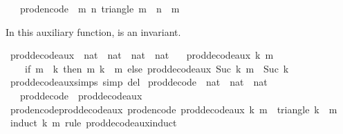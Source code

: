 \begin{isabellebody}
\ \ \ {\isachardoublequoteopen}prod{\isacharunderscore}encode\ {\isacharequal}\ {\isacharparenleft}{\isasymlambda}{\isacharparenleft}m{\isacharcomma}\ n{\isacharparenright}{\isachardot}\ triangle\ {\isacharparenleft}m\ {\isacharplus}\ n{\isacharparenright}\ {\isacharplus}\ m{\isacharparenright}{\isachardoublequoteclose}%
\begin{isamarkuptext}%
In this auxiliary function,  is an invariant.%
\end{isamarkuptext}\isamarkuptrue%
\isamarkupfalse%
\ prod{\isacharunderscore}decode{\isacharunderscore}aux\ {\isacharcolon}{\isacharcolon}\ {\isachardoublequoteopen}nat\ {\isasymRightarrow}\ nat\ {\isasymRightarrow}\ nat\ {\isasymtimes}\ nat{\isachardoublequoteclose}\isanewline
\ \ \ {\isachardoublequoteopen}prod{\isacharunderscore}decode{\isacharunderscore}aux\ k\ m\ {\isacharequal}\isanewline
\ \ \ \ {\isacharparenleft}if\ m\ {\isasymle}\ k\ then\ {\isacharparenleft}m{\isacharcomma}\ k\ {\isacharminus}\ m{\isacharparenright}\ else\ prod{\isacharunderscore}decode{\isacharunderscore}aux\ {\isacharparenleft}Suc\ k{\isacharparenright}\ {\isacharparenleft}m\ {\isacharminus}\ Suc\ k{\isacharparenright}{\isacharparenright}{\isachardoublequoteclose}\isanewline
\isanewline
{}\isamarkupfalse%
\ prod{\isacharunderscore}decode{\isacharunderscore}aux{\isachardot}simps\ {\isacharbrackleft}simp\ del{\isacharbrackright}\isanewline
\isanewline
{}\isamarkupfalse%
\ prod{\isacharunderscore}decode\ {\isacharcolon}{\isacharcolon}\ {\isachardoublequoteopen}nat\ {\isasymRightarrow}\ nat\ {\isasymtimes}\ nat{\isachardoublequoteclose}\isanewline
\ \ \ {\isachardoublequoteopen}prod{\isacharunderscore}decode\ {\isacharequal}\ prod{\isacharunderscore}decode{\isacharunderscore}aux\ {}{\isachardoublequoteclose}\isanewline
\isanewline
{}\isamarkupfalse%
\ prod{\isacharunderscore}encode{\isacharunderscore}prod{\isacharunderscore}decode{\isacharunderscore}aux{\isacharcolon}\ {\isachardoublequoteopen}prod{\isacharunderscore}encode\ {\isacharparenleft}prod{\isacharunderscore}decode{\isacharunderscore}aux\ k\ m{\isacharparenright}\ {\isacharequal}\ triangle\ k\ {\isacharplus}\ m{\isachardoublequoteclose}\isanewline
%
\isadelimproof
\ \ %
\endisadelimproof
%
\isatagproof
{}\isamarkupfalse%
\ {\isacharparenleft}induct\ k\ m\ rule{\isacharcolon}\ prod{\isacharunderscore}decode{\isacharunderscore}aux{\isachardot}induct{\isacharparenright}\isanewline

\end{isabellebody}
